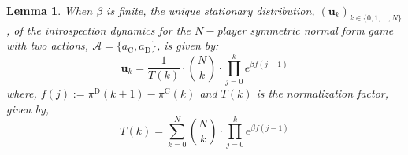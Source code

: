 \documentclass[11pt]{article}
\theoremstyle{plainCl1}
\theoremstyle{plainCl2}
\newtheorem{lemma}{Lemma}
\newcommand{\abf}{\mathbf{a}}
\newcommand{\ubf}{\mathbf{u}}
\newcommand{\C}{\mathrm{C}}
\newcommand{\D}{\mathrm{D}}
\begin{document}
%
%
\begin{lemma}
When $\beta$ is finite, the unique stationary distribution, $(\ubf_k)_{k \in \{0,1,...,N\}}$, of the introspection dynamics for the $N-$player symmetric normal form game with two actions, $\mathcal{A} = \{a_\C, a_\D \}$, is given by:
\begin{equation}
\label{Eq:stationary-dist-symm-2-stgs}
\ubf_k = \frac{1}{T(k)} \cdot {N \choose k} \cdot \displaystyle \prod_{j=0}^{k} \displaystyle e^{\beta f(j-1)}
\end{equation}
where, $f(j) := \pi^\D(k+1) - \pi^\C(k)$ and $T(k)$ is the normalization factor, given by,
\begin{equation}
\label{Eq:normalization-Tk}
T(k) = \displaystyle \sum_{k=0}^N {N \choose k} \cdot \displaystyle \prod_{j=0}^{k} \displaystyle e^{\beta f(j-1)}
\end{equation}
\end{lemma}
\end{document}
